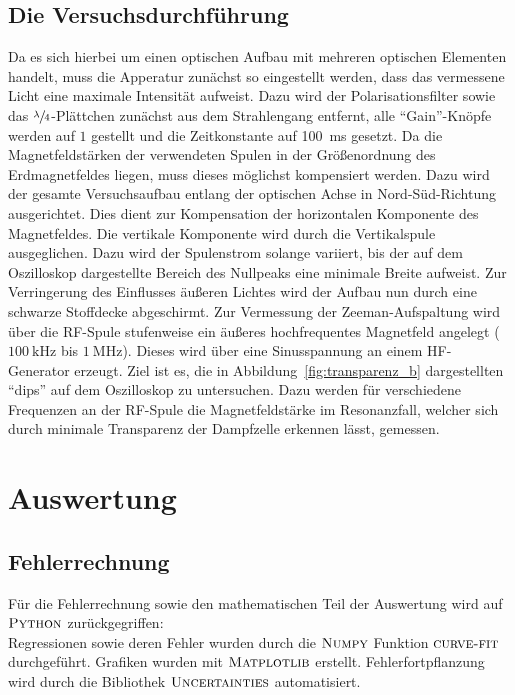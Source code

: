 \documentclass[
  bibliography=totoc,     %
  captions=tableheading,  %
  titlepage=firstiscover, %
]{scrartcl}
\begin{document}
\subsection{Die Versuchsdurchführung}
Da es sich hierbei um einen optischen Aufbau mit mehreren optischen Elementen
handelt, muss die Apperatur zunächst so eingestellt werden, dass das vermessene
Licht eine maximale Intensität aufweist. Dazu wird der Polarisationsfilter
sowie das $\sfrac{\lambda}{4}$-Plättchen zunächst aus dem Strahlengang entfernt,
alle \enquote{Gain}-Knöpfe werden auf $1$ gestellt und die Zeitkonstante auf
\SI{100}{\milli\second} gesetzt.
Da die Magnetfeldstärken der verwendeten Spulen in der Größenordnung des
Erdmagnetfeldes liegen, muss dieses möglichst kompensiert werden. Dazu wird der
gesamte Versuchsaufbau entlang der optischen Achse in Nord-Süd-Richtung
ausgerichtet. Dies dient zur Kompensation der horizontalen Komponente des
Magnetfeldes. Die vertikale Komponente wird durch die Vertikalspule
ausgeglichen. Dazu wird der Spulenstrom solange variiert, bis der auf dem
Oszilloskop dargestellte Bereich des Nullpeaks eine minimale Breite aufweist.
Zur Verringerung des Einflusses äußeren Lichtes wird der Aufbau nun durch eine
schwarze Stoffdecke abgeschirmt.
\noindent
Zur Vermessung der Zeeman-Aufspaltung wird über die RF-Spule stufenweise ein äußeres
hochfrequentes Magnetfeld angelegt ($\SI{100}{\kilo\hertz}$ bis $\SI{1}{\mega\hertz}$).
Dieses wird über eine Sinusspannung an einem HF-Generator erzeugt. Ziel ist es, die in
Abbildung~\ref{fig:transparenz_b} dargestellten \enquote{dips} auf dem Oszilloskop
zu untersuchen. Dazu werden für verschiedene Frequenzen an der RF-Spule die
Magnetfeldstärke im Resonanzfall, welcher sich durch minimale Transparenz der
Dampfzelle erkennen lässt, gemessen.\\
\clearpage
\section{Auswertung}
\label{sec:auswertung}
\subsection{Fehlerrechnung}
  Für die Fehlerrechnung sowie den mathematischen Teil der Auswertung wird auf
  $\textsc{Python}$ zurückgegriffen:\\
  Regressionen sowie deren Fehler wurden durch die $\textsc{Numpy}$ \cite{numpy} Funktion
  $\textsc{curve-fit}$ durchgeführt. Grafiken wurden mit $\textsc{Matplotlib}$ \cite{matplotlib}
  erstellt.
  Fehlerfortpflanzung wird durch die Bibliothek
  $\textsc{Uncertainties}$ \cite{uncertainties} automatisiert.
\end{document}
